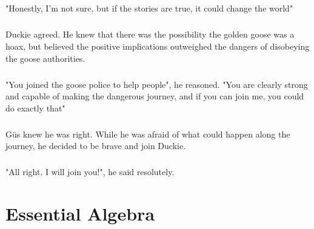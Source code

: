 \documentclass[a4paper,11pt ]{book}
\begin{document}
\paragraph{} "Honestly, I'm not sure, but if the stories are true, it could change the world"
\paragraph{} Duckie agreed. He knew that there was the possibility the golden goose was a hoax, but believed the positive implications outweighed the dangers of disobeying the goose authorities. 
\paragraph{} "You joined the goose police to help people", he reasoned. "You are clearly strong and capable of making the dangerous journey, and if you can join me, you could do exactly that"
\paragraph{} Güs knew he was right. While he was afraid of what could happen along the journey, he decided to be brave and join Duckie. 
\paragraph{} "All right. I will join you!", he said resolutely. 
\chapter{Essential Algebra}
\end{document}
